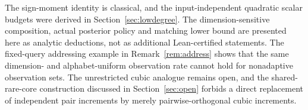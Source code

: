 \begin{remark}
The sign-moment identity is classical, and the input-independent quadratic scalar budgets were derived in Section~\ref{sec:lowdegree}. The dimension-sensitive composition, actual posterior policy and matching lower bound are presented here as analytic deductions, not as additional Lean-certified statements. The fixed-query addressing example in Remark~\ref{rem:address} shows that the same dimension- and alphabet-uniform observation rate cannot hold for nonadaptive observation sets. The unrestricted cubic analogue remains open, and the shared-rare-core construction discussed in Section~\ref{sec:open} forbids a direct replacement of independent pair increments by merely pairwise-orthogonal cubic increments.
\end{remark}
